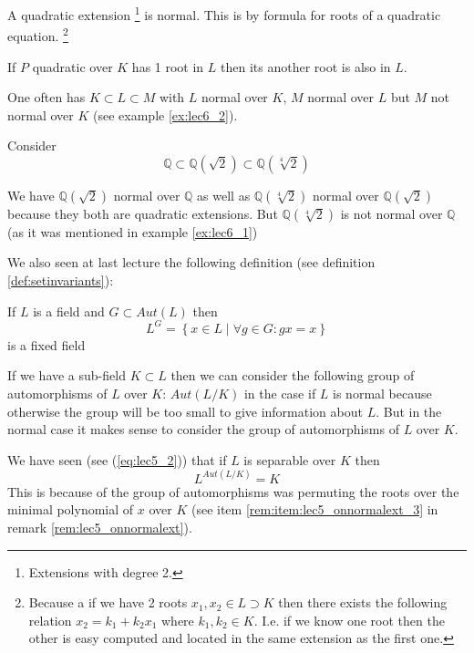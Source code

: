 \begin{remark}
  A quadratic extension
  \footnote {
    Extensions with degree 2. 
  }
  is normal. This is by formula for roots of a
  quadratic equation.
  \footnote {
    Because a if we have 2 roots $x_1, x_2 \in L \supset K$ then there
    exists the following relation $x_2 = k_1 + k_2 x_1$ where $k_1,
    k_2 \in K$. I.e. if we know one root then the other is easy
    computed and located in the same extension as the first one. 
  }

  If $P$ quadratic over $K$ has 1 root in $L$ then its another root is
  also in $L$.
\end{remark}

\begin{remark}
  One often has $K \subset L \subset M$ with $L$ normal over $K$, $M$
  normal over $L$ but $M$ not normal over $K$ (see example
  \ref{ex:lec6_2}). 
\end{remark}

\begin{example}
  Consider
  \[
  \mathbb{Q} \subset
  \mathbb{Q}\left(\sqrt{2}\right)
  \subset
  \mathbb{Q}\left(\sqrt[4]{2}\right)
  \]

  We have $\mathbb{Q}\left(\sqrt{2}\right)$ normal over $\mathbb{Q}$
  as well as $\mathbb{Q}\left(\sqrt[4]{2}\right)$ normal over
  $\mathbb{Q}\left(\sqrt{2}\right)$ because they both are quadratic
  extensions. But 
  $\mathbb{Q}\left(\sqrt[4]{2}\right)$ is not normal over $\mathbb{Q}$
  (as it was mentioned in example \ref{ex:lec6_1})
  \label{ex:lec6_2}
\end{example}

We also seen at last lecture the following definition
(see definition \ref{def:setinvariants}):
\begin{definition}
  If $L$ is a field and $G \subset Aut\left(L\right)$ then
  \[
  L^G = \left\{
  x \in L \mid \forall g \in G: g x = x 
  \right\}
  \]  
  is a fixed field
  \label{def:fixedfield}
\end{definition}

If we have a sub-field $K \subset L$ then we can consider the
following group of automorphisms of $L$ over $K$:
$Aut\left(L/K\right)$ in the case if $L$ is normal because otherwise
the group will be too small to give information 
about $L$. But in the normal case it makes sense to consider  
the group of automorphisms of $L$ over $K$.

We have seen (see (\ref{eq:lec5_2})) that if $L$ is separable over $K$
then 
\[
L^{Aut\left(L/K\right)} = K
\]
This is because of the group of automorphisms was permuting the roots
over the minimal polynomial of $x$ over $K$ (see item
\ref{rem:item:lec5_onnormalext_3} in remark
\ref{rem:lec5_onnormalext}). 


